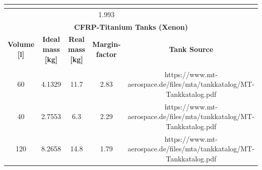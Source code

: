 \begin{table}[]
{\begin{tabular}{|ccccc|}
\multicolumn{1}{|c|}{}                        & \multicolumn{1}{c|}{}                             & \multicolumn{1}{c|}{}                            & \multicolumn{1}{c|}{}                             &                                                                                                                  \\ \hline
\multicolumn{1}{|c|}{}                        & \multicolumn{1}{c|}{}                             & \multicolumn{1}{c|}{}                            & \multicolumn{1}{c|}{{\color[HTML]{FF6D01} 1.993}} &                                                                                                                  \\ \hline
\multicolumn{5}{|c|}{\cellcolor[HTML]{8DB4E1}\textbf{CFRP-Titanium Tanks   (Xenon)}}                                                                                                                                                                                                                                        \\ \hline
\multicolumn{1}{|c|}{\textbf{Volume {[}l{]}}} & \multicolumn{1}{c|}{\textbf{Ideal mass {[}kg{]}}} & \multicolumn{1}{c|}{\textbf{Real mass {[}kg{]}}} & \multicolumn{1}{c|}{\textbf{Margin-factor}}       & \textbf{Tank Source}                                                                                             \\ \hline
\multicolumn{1}{|c|}{}                        & \multicolumn{1}{c|}{}                             & \multicolumn{1}{c|}{}                            & \multicolumn{1}{c|}{}                             &                                                                                                                  \\ \hline
\multicolumn{1}{|c|}{60}                      & \multicolumn{1}{c|}{4.1329}                       & \multicolumn{1}{c|}{11.7}                        & \multicolumn{1}{c|}{2.83}                         & https://www.mt-aerospace.de/files/mta/tankkatalog/MT-Tankkatalog.pdf                                             \\ \hline
\multicolumn{1}{|c|}{40}                      & \multicolumn{1}{c|}{2.7553}                       & \multicolumn{1}{c|}{6.3}                         & \multicolumn{1}{c|}{2.29}                         & https://www.mt-aerospace.de/files/mta/tankkatalog/MT-Tankkatalog.pdf                                             \\ \hline
\multicolumn{1}{|c|}{120}                     & \multicolumn{1}{c|}{8.2658}                       & \multicolumn{1}{c|}{14.8}                        & \multicolumn{1}{c|}{1.79}                         & https://www.mt-aerospace.de/files/mta/tankkatalog/MT-Tankkatalog.pdf                                             \\ \hline

\end{tabular}}
\end{table}
